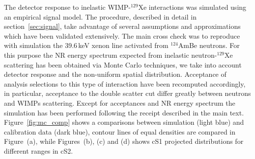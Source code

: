 The detector response to inelastic WIMP-$^{129}$Xe interactions was simulated using an empirical signal model. 
The procedure, described in detail in section~\ref{sec:signal}, take advantage of several 
assumptions and approximations which have been validated extensively. 
The main cross check was to reproduce with simulation the 39.6\,keV xenon line activated from $^{124}$AmBe neutrons. 
For this purpose the NR energy spectrum expected from inelastic neutron-$^{129}$Xe scattering has been obtained via  Monte Carlo techniques, 
we take into account detector response and the non-uniform spatial distribution. Acceptance of analysis selections to this type of interaction 
have been recomputed accordingly, in particular, acceptance to the double scatter cut differ greatly between neutrons and WIMPs scattering. 
Except for acceptances and NR energy spectrum the simulation has been performed following the receipt described in the main text. Figure~\ref{fig:mc_comp}
shows a comparisons between simulation (light blue) and calibration data (dark blue), contour lines of equal densities are compared in Figure~(a), 
while Figures~(b), (c) and (d) shows cS1 projected distributions for different ranges in cS2.


